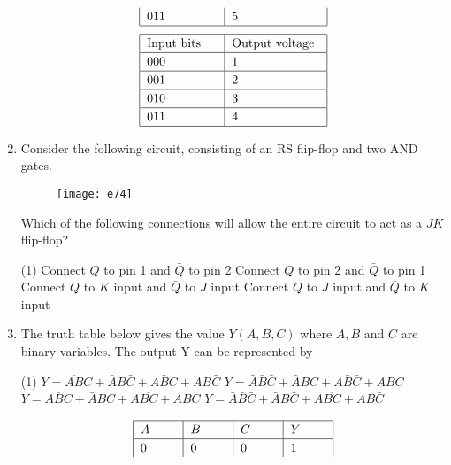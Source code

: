 \begin{enumerate}
\begin{tasks}
\begin{align*}
\begin{tabular}{|p{2cm} |p{2.5cm}|}
		011&5\\	\hline
		\end{tabular}
		\end{align*}
		\task[\textbf{D.}] 	\begin{align*}
		\begin{tabular}{|p{2cm} |p{2.5cm}|}
		\hline
		Input bits& Output voltage\\\hline
		000&1\\	\hline
		001&2\\	\hline
		010&3\\	\hline
		011&4\\	\hline
		\end{tabular}
		\end{align*}
	\end{tasks}
	\item Consider the following circuit, consisting of an RS flip-flop and two AND gates.\\
	\begin{figure}[H]
		\centering
		\texttt{[image: e74]}
	\end{figure}
	Which of the following connections will allow the entire circuit to act as a $JK$  flip-flop?
	{}
	\begin{tasks}(1)
		\task[\textbf{A.}]  Connect $Q$ to pin 1 and $\bar{Q}$ to pin 2
		\task[\textbf{B.}] Connect $Q$ to pin 2 and $\bar{Q}$ to pin 1
		\task[\textbf{C.}] Connect $Q$ to $K$ input and $\bar{Q}$ to $J$ input
		\task[\textbf{D.}] Connect $Q$ to $J$ input and $\bar{Q}$ to $K$ input
	\end{tasks}
	\item The truth table below gives the value $Y ( A , B , C)$  where $A , B$ and $C$ are binary variables.
	The output Y can be represented by
	{}
	\begin{tasks}(1)
		\task[\textbf{A.}] $Y=\overline{A B} C+\bar{A} B \bar{C}+A \bar{B} C+A B \bar{C}$
		\task[\textbf{B.}] $Y=\bar{A} \bar{B} \bar{C}+\bar{A} B C+A \bar{B} \bar{C}+A B C$
		\task[\textbf{C.}] $Y=\overline{A B C}+\bar{A} B C+A \overline{B C}+A B C$
		\task[\textbf{D.}] $Y=\bar{A} \bar{B} \bar{C}+\bar{A} B \bar{C}+A \overline{B C}+A B \bar{C}$
	\end{tasks}
	\begin{align*}
	\renewcommand*{\arraystretch}{1.2}
	\begin{tabular}{|p{1cm}|p{1cm}|p{1cm}|p{1cm}|}
	\hline$A$ & $B$ & $C$ & $Y$ \\
	\hline 0 & 0 & 0 & 1 \\

\end{tabular}
\end{align*}
\end{enumerate}
